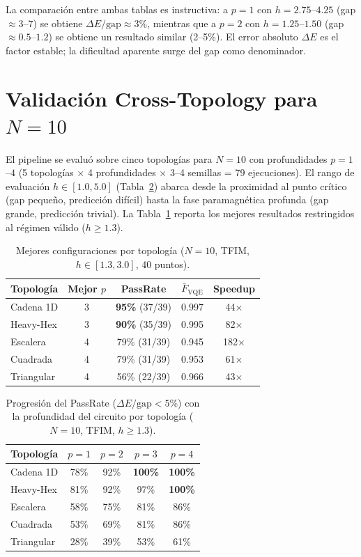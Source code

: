 \documentclass[11pt,a4paper,spanish]{book}
\begin{document}
La comparación entre ambas tablas es instructiva: a $p = 1$ con $h = 2.75$--$4.25$ (gap $\approx 3$--$7$) se obtiene $\Delta E/\text{gap} \approx 3\%$, mientras que a $p = 2$ con $h = 1.25$--$1.50$ (gap $\approx 0.5$--$1.2$) se obtiene un resultado similar (2--5\%). El error absoluto $\Delta E$ es el factor estable; la dificultad aparente surge del gap como denominador.



\section{Validación Cross-Topology para $N = 10$}

El pipeline se evaluó sobre cinco topologías para $N = 10$ con profundidades $p = 1$--$4$ (5 topologías $\times$ 4 profundidades $\times$ 3--4 semillas = 79 ejecuciones). El rango de evaluación $h \in [1.0, 5.0]$ (Tabla~\ref{tab:cross_topo_depth}) abarca desde la proximidad al punto crítico (gap pequeño, predicción difícil) hasta la fase paramagnética profunda (gap grande, predicción trivial). La Tabla~\ref{tab:cross_topo} reporta los mejores resultados restringidos al régimen válido ($h \geq 1.3$).

\begin{table}[h]
\centering
\caption{Mejores configuraciones por topología ($N = 10$, TFIM, $h \in [1.3, 3.0]$, 40 puntos).}
\label{tab:cross_topo}
\begin{tabular}{lcccc}
\toprule
\textbf{Topología} & \textbf{Mejor $p$} & \textbf{PassRate} & \textbf{$\bar{F}_{\text{VQE}}$} & \textbf{Speedup} \\
\midrule
Cadena 1D & 3 & \textbf{95\%} (37/39) & 0.997 & 44$\times$ \\
Heavy-Hex & 3 & \textbf{90\%} (35/39) & 0.995 & 82$\times$ \\
Escalera & 4 & 79\% (31/39) & 0.945 & 182$\times$ \\
Cuadrada & 4 & 79\% (31/39) & 0.953 & 61$\times$ \\
Triangular & 4 & 56\% (22/39) & 0.966 & 43$\times$ \\
\bottomrule
\end{tabular}
\end{table}

\begin{table}[h]
\centering
\caption{Progresión del PassRate ($\Delta E/\text{gap} < 5\%$) con la profundidad del circuito por topología ($N = 10$, TFIM, $h \geq 1.3$).}
\label{tab:cross_topo_depth}
\begin{tabular}{lcccc}
\toprule
\textbf{Topología} & \textbf{$p = 1$} & \textbf{$p = 2$} & \textbf{$p = 3$} & \textbf{$p = 4$} \\
\midrule
Cadena 1D & 78\% & 92\% & \textbf{100\%} & \textbf{100\%} \\
Heavy-Hex & 81\% & 92\% & 97\% & \textbf{100\%} \\
Escalera & 58\% & 75\% & 81\% & 86\% \\
Cuadrada & 53\% & 69\% & 81\% & 86\% \\
Triangular & 28\% & 39\% & 53\% & 61\% \\
\bottomrule
\end{tabular}
\end{table}
\end{document}
